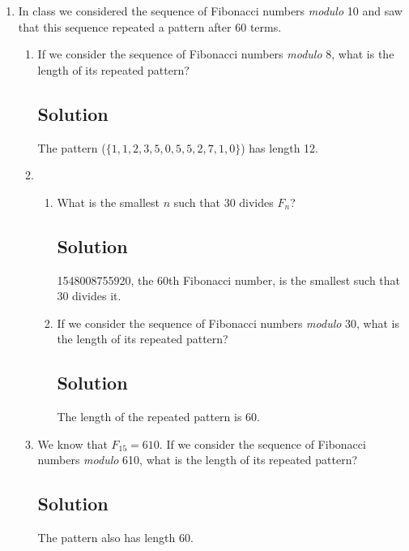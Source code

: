 \documentclass[12pt]{amsart}
\begin{document}
\begin{enumerate}
\begin{enumerate}
\end{enumerate}

\item In class we considered the sequence of Fibonacci numbers {\it modulo} 10 and saw that this sequence repeated a pattern after 60 terms.

\begin{enumerate}\setlength{\itemsep}{6pt}
\item If we consider the sequence of Fibonacci numbers {\it modulo} 8, what is the length of its repeated pattern?

\subsection*{Solution}
The pattern ($\{1, 1, 2, 3, 5, 0, 5, 5, 2, 7, 1, 0\}$) has length 12.

\item 
\begin{enumerate}\setlength{\itemsep}{6pt}
\item What is the smallest $n$ such that 30 divides $F_n$?

\subsection*{Solution}
1548008755920, the 60th Fibonacci number, is the smallest such that 30 divides it.

\item If we consider the sequence of Fibonacci numbers {\it modulo} 30, what is the length of its repeated pattern?

\subsection*{Solution}
The length of the repeated pattern is 60.

\end{enumerate}

\item We know that $F_{15} = 610$. If we consider the sequence of Fibonacci numbers {\it modulo} 610, what is the length of its repeated pattern?

\subsection*{Solution}
The pattern also has length 60.

\end{enumerate}


\end{enumerate}
\end{document}
